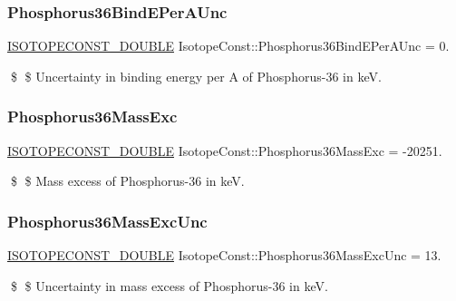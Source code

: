 \subsubsection{\texorpdfstring{Phosphorus36\+Bind\+E\+Per\+A\+Unc}{Phosphorus36BindEPerAUnc}}
{\footnotesize\ttfamily \mbox{\hyperlink{group___isotope_const-_macros_ga8f45a7272ce02c0b4c65c44636ed719a}{I\+S\+O\+T\+O\+P\+E\+C\+O\+N\+S\+T\+\_\+\+D\+O\+U\+B\+LE}} Isotope\+Const\+::\+Phosphorus36\+Bind\+E\+Per\+A\+Unc = 0.}

\$ \$ Uncertainty in binding energy per A of Phosphorus-\/36 in keV. \mbox{\label{group___isotope_const-_phosphorus-_p36_gaebbeff69c31275cabcd89f1392d2ea3d}} 
\subsubsection{\texorpdfstring{Phosphorus36\+Mass\+Exc}{Phosphorus36MassExc}}
{\footnotesize\ttfamily \mbox{\hyperlink{group___isotope_const-_macros_ga8f45a7272ce02c0b4c65c44636ed719a}{I\+S\+O\+T\+O\+P\+E\+C\+O\+N\+S\+T\+\_\+\+D\+O\+U\+B\+LE}} Isotope\+Const\+::\+Phosphorus36\+Mass\+Exc = -\/20251.}

\$ \$ Mass excess of Phosphorus-\/36 in keV. \mbox{\label{group___isotope_const-_phosphorus-_p36_gabc66973f89be29665633abd198b2af85}} 
\subsubsection{\texorpdfstring{Phosphorus36\+Mass\+Exc\+Unc}{Phosphorus36MassExcUnc}}
{\footnotesize\ttfamily \mbox{\hyperlink{group___isotope_const-_macros_ga8f45a7272ce02c0b4c65c44636ed719a}{I\+S\+O\+T\+O\+P\+E\+C\+O\+N\+S\+T\+\_\+\+D\+O\+U\+B\+LE}} Isotope\+Const\+::\+Phosphorus36\+Mass\+Exc\+Unc = 13.}

\$ \$ Uncertainty in mass excess of Phosphorus-\/36 in keV. \mbox{\label{group___isotope_const-_phosphorus-_p36_ga1e608c1303ca95566325f5c88a23bb13}} 
